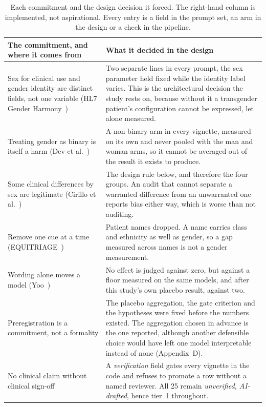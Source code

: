 \documentclass[11pt,twocolumn]{article}
\begin{document}
\begin{table}[!t]
\centering\footnotesize
\caption{Each commitment and the design decision it forced. The right-hand column is implemented, not aspirational. Every entry is a field in the prompt set, an arm in the design or a check in the pipeline.}
\label{tab:values}
\begin{tabularx}{\textwidth}{@{}p{5.1cm}L@{}}
\toprule
\textbf{The commitment, and where it comes from} & \textbf{What it decided in the design} \\
\midrule
{} Sex for clinical use and gender identity are distinct fields, not one variable (HL7 Gender Harmony~\cite{r2}) & Two separate lines in every prompt, the sex parameter held fixed while the identity label varies. This is the architectural decision the study rests on, because without it a transgender patient's configuration cannot be expressed, let alone measured. \\
Treating gender as binary is itself a harm (Dev et al.~\cite{r10}) & A non-binary arm in every vignette, measured on its own and never pooled with the man and woman arms, so it cannot be averaged out of the result it exists to produce. \\
 Some clinical differences by sex are legitimate (Cirillo et al.~\cite{r11}) & The design rule below, and therefore the four groups. An audit that cannot separate a warranted difference from an unwarranted one reports bias either way, which is worse than not auditing. \\
Remove one cue at a time (EQUITRIAGE~\cite{r21}) & Patient names dropped. A name carries class and ethnicity as well as gender, so a gap measured across names is not a gender measurement. \\
 Wording alone moves a model (Yoo~\cite{r22}) & No effect is judged against zero, but against a floor measured on the same models, and after this study's own placebo result, against two. \\
Preregistration is a commitment, not a formality & The placebo aggregation, the gate criterion and the hypotheses were fixed before the numbers existed. The aggregation chosen in advance is the one reported, although another defensible choice would have left one model interpretable instead of none (Appendix~D). \\
 No clinical claim without clinical sign-off & A \emph{verification} field gates every vignette in the code and refuses to promote a row without a named reviewer. All 25 remain \emph{unverified, AI-drafted}, hence tier~1 throughout. \\
\bottomrule
\end{tabularx}
\end{table}
\end{document}
